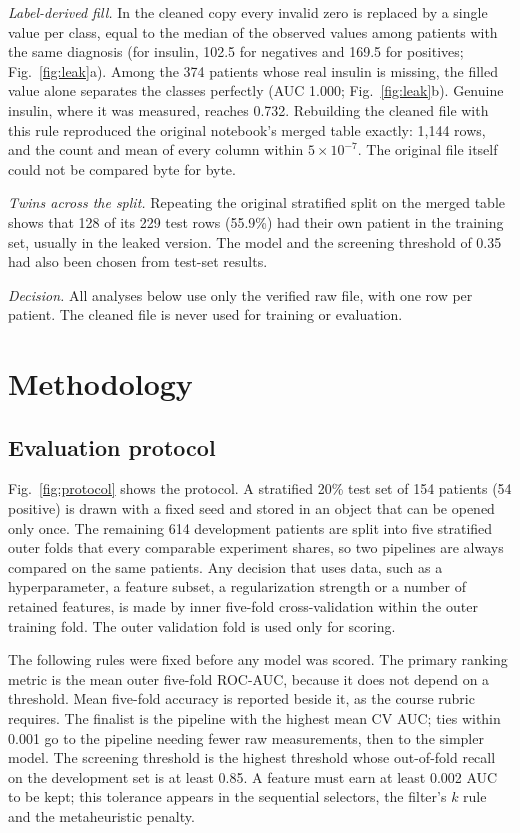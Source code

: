 \documentclass[conference]{IEEEtran}
\begin{document}
\textit{Label-derived fill.} In the cleaned copy every invalid zero is replaced by a single value per class, equal to the median of the observed values among patients with the same diagnosis (for insulin, 102.5 for negatives and 169.5 for positives; Fig.~\ref{fig:leak}a). Among the 374 patients whose real insulin is missing, the filled value alone separates the classes perfectly (AUC 1.000; Fig.~\ref{fig:leak}b). Genuine insulin, where it was measured, reaches 0.732. Rebuilding the cleaned file with this rule reproduced the original notebook's merged table exactly: 1,144 rows, and the count and mean of every column within $5\times10^{-7}$. The original file itself could not be compared byte for byte.

\textit{Twins across the split.} Repeating the original stratified split on the merged table shows that 128 of its 229 test rows (55.9\%) had their own patient in the training set, usually in the leaked version. The model and the screening threshold of 0.35 had also been chosen from test-set results.

\textit{Decision.} All analyses below use only the verified raw file, with one row per patient. The cleaned file is never used for training or evaluation.

\section{Methodology}
\label{sec:method}

\subsection{Evaluation protocol}
Fig.~\ref{fig:protocol} shows the protocol. A stratified 20\% test set of 154 patients (54 positive) is drawn with a fixed seed and stored in an object that can be opened only once. The remaining 614 development patients are split into five stratified outer folds that every comparable experiment shares, so two pipelines are always compared on the same patients. Any decision that uses data, such as a hyperparameter, a feature subset, a regularization strength or a number of retained features, is made by inner five-fold cross-validation within the outer training fold. The outer validation fold is used only for scoring.

The following rules were fixed before any model was scored. The primary ranking metric is the mean outer five-fold ROC-AUC, because it does not depend on a threshold. Mean five-fold accuracy is reported beside it, as the course rubric requires. The finalist is the pipeline with the highest mean CV AUC; ties within 0.001 go to the pipeline needing fewer raw measurements, then to the simpler model. The screening threshold is the highest threshold whose out-of-fold recall on the development set is at least 0.85. A feature must earn at least 0.002 AUC to be kept; this tolerance appears in the sequential selectors, the filter's $k$ rule and the metaheuristic penalty.
\end{document}
